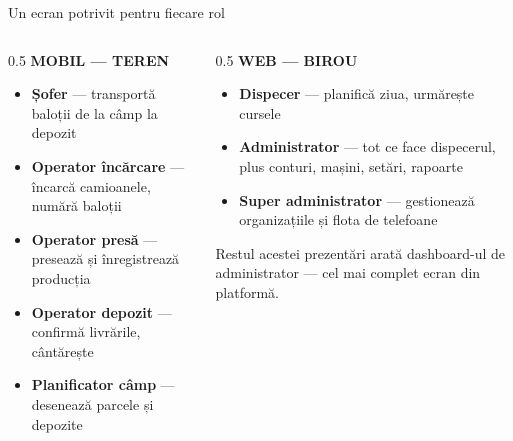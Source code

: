 \documentclass[aspectratio=169,10pt]{beamer}
\begin{document}
\begin{frame}{Un ecran potrivit pentru fiecare rol}
  \vspace{0.3cm}
  \begin{columns}[T]
    \begin{column}{0.5\linewidth}
      {\sffamily\bfseries\small\color{sbMuted}\MakeUppercase{Mobil — teren}}\\[0.25cm]
      \begin{itemize}
        \item \textbf{Șofer} — transportă baloții de la câmp la depozit
        \item \textbf{Operator încărcare} — încarcă camioanele, numără baloții
        \item \textbf{Operator presă} — presează și înregistrează producția
        \item \textbf{Operator depozit} — confirmă livrările, cântărește
        \item \textbf{Planificator câmp} — desenează parcele și depozite
      \end{itemize}
    \end{column}
    \begin{column}{0.5\linewidth}
      {\sffamily\bfseries\small\color{sbMuted}\MakeUppercase{Web — birou}}\\[0.25cm]
      \begin{itemize}
        \item \textbf{Dispecer} — planifică ziua, urmărește cursele
        \item \textbf{Administrator} — tot ce face dispecerul, plus conturi, mașini, setări, rapoarte
        \item \textbf{Super administrator} — gestionează organizațiile și flota de telefoane
      \end{itemize}
      \vspace{0.4cm}
      {\sffamily\footnotesize\color{sbMuted} Restul acestei prezentări arată dashboard-ul de administrator — cel mai complet ecran din platformă.}
    \end{column}
  \end{columns}
\end{frame}

\end{document}
